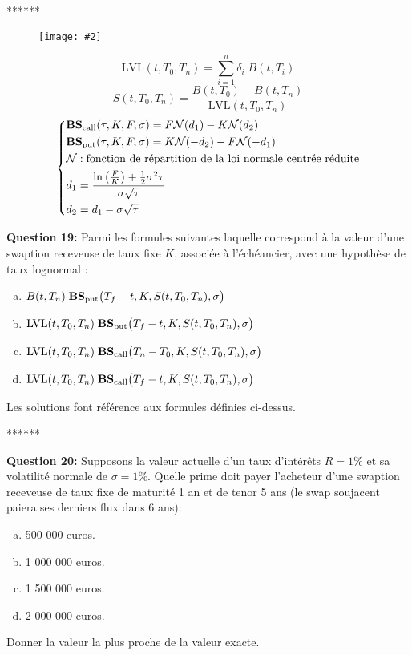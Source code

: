 \documentclass{article}
\newcommand{\FIG}[2]{\texttt{[image: \#2]}}
\newcommand{\indentitem}{\setlength\itemindent{25pt}}
\begin{document}
\newpage
\smallskip
\centerline{******}
\smallskip
\begin{figure}[H]
\FIG{15cm}{figures/schema_swaption.jpg}
\end{figure}
\[
\text{LVL}(t,T_0,T_n)=\sum_{i=1}^{n}\delta_i \;B(t,T_i)
\]
\[
S(t,T_0,T_n)= \frac{B(t,T_0)-B(t,T_n)}{\text{LVL}(t,T_0,T_n)}
\]
\[
\left\{
\begin{split}
&\text{\textbf{BS}}_\text{call}(\tau,K,F,\sigma)=F\mathcal{N}(d_1)-K \mathcal{N}(d_2)\\
&\text{\textbf{BS}}_\text{put}(\tau,K,F,\sigma)=K\mathcal{N}(-d_2)-F \mathcal{N}(-d_1)\\
&\mathcal{N} : \text{fonction de répartition de la loi normale centrée réduite}\\
&d_1=\frac{\ln\left(\frac{F}{K}\right)+\frac{1}{2}\sigma^2\tau}{\sigma\sqrt{\tau}}\\
&d_2=d_1-\sigma\sqrt{\tau}
\end{split}
\right.
\]

\textbf{Question 19:}
Parmi les formules suivantes laquelle correspond à la valeur d’une swaption receveuse de taux fixe $K$, associée à l’échéancier,  avec une hypothèse de taux lognormal :
\begin{enumerate}[a)]
\indentitem \item $B(t,T_n) \;\text{\textbf{BS}}_\text{put}\big(T_f-t,K,S(t,T_{0},T_n),\sigma\big)$
\indentitem \item $\text{LVL}(t,T_0,T_n) \;\text{\textbf{BS}}_\text{put}\big(T_f-t,K,S(t,T_{0},T_n),\sigma\big)$
\indentitem \item $\text{LVL}(t,T_0,T_n) \;\text{\textbf{BS}}_\text{call}\big(T_n-T_0,K,S(t,T_{0},T_n),\sigma\big)$
\indentitem \item $\text{LVL}(t,T_0,T_n) \;\text{\textbf{BS}}_\text{call}\big(T_f-t,K,S(t,T_{0},T_n),\sigma\big)$
\end{enumerate}
Les solutions font référence aux formules définies ci-dessus.
\newpage
\smallskip
\centerline{******}
\smallskip
\textbf{Question 20:} 
Supposons la valeur actuelle d'un taux d'intérêts $R=1\%$ et sa volatilité normale de $\sigma=1\%$. Quelle prime doit payer l'acheteur d'une swaption receveuse de taux fixe de maturité 1 an et de tenor 5 ans (le swap soujacent paiera ses derniers flux dans 6 ans):
\begin{enumerate}[a)]
\indentitem \item 500 000 euros.
\indentitem \item 1 000 000 euros.
\indentitem \item 1 500 000 euros.
\indentitem \item 2 000 000 euros.
\end{enumerate}
Donner la valeur la plus proche de la valeur exacte.
\end{document}
